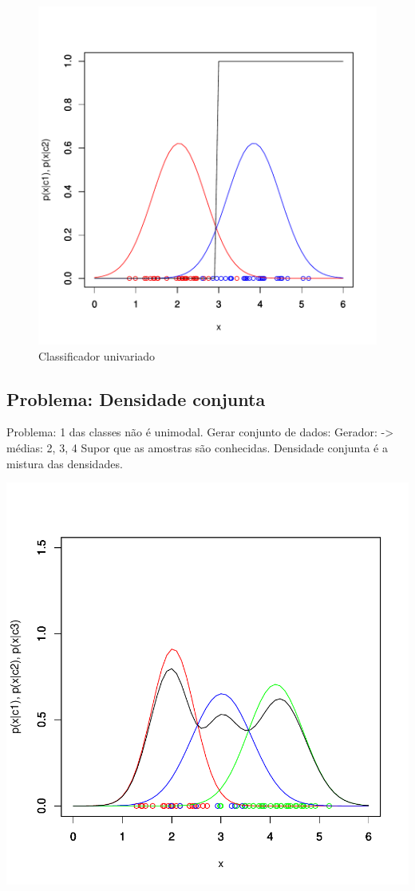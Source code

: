 \documentclass{article}
\begin{document}
\begin{figure}[h]
\centering
\includegraphics{aula3-003}
\caption{Classificador univariado}
\label{Fig2}
\end{figure}


\subsection{Problema: Densidade conjunta}

Problema: 1 das classes não é unimodal. Gerar conjunto de dados:
Gerador:
-> médias: 2, 3, 4
Supor que as amostras são conhecidas. Densidade conjunta é a mistura das densidades.

\includegraphics{aula3-004}

\end{document}
